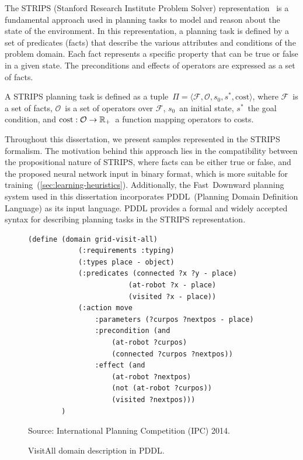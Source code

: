 The STRIPS (Stanford Research Institute Problem Solver) representation~\cite{Fikes.Nilsson/1971} is a fundamental approach used in planning tasks to model and reason about the state of the environment. In this representation, a planning task is defined by a set of predicates (facts) that describe the various attributes and conditions of the problem domain. Each fact represents a specific property that can be true or false in a given state. The preconditions and effects of operators are expressed as a set of facts.

\begin{definition}
    \label{def:strips}
    A STRIPS planning task is defined as a tuple~$\Pi=\langle\mathcal{F},\mathcal{O},s_0,s^*, \text{cost}\rangle$, where $\mathcal{F}$~is a set of facts, $\mathcal{O}$~is a set of operators over $\mathcal{F}$, $s_0$~an initial state, $s^*$~the goal condition, and $\text{cost}:\mathcal{O}\rightarrow\mathbb{R}_{+}$~a function mapping operators to costs.
\end{definition}

Throughout this dissertation, we present samples represented in the STRIPS formalism. The motivation behind this approach lies in the compatibility between the propositional nature of STRIPS, where facts can be either true or false, and the proposed neural network input in binary format, which is more suitable for training~(\cref{sec:learning-heuristics}). Additionally, the Fast~Downward planning system used in this dissertation incorporates PDDL~(Planning Domain Definition Language) as its input language. PDDL provides a formal and widely accepted syntax for describing planning tasks in the STRIPS representation.

\begin{figure}[ht]
    \caption{VisitAll domain description in PDDL.}
    \label{fig:pddl}
    \centering
    \begin{lstlisting}[basicstyle=\ttfamily]
        (define (domain grid-visit-all)
            (:requirements :typing)
            (:types place - object)
            (:predicates (connected ?x ?y - place)
                        (at-robot ?x - place)
                        (visited ?x - place))
            (:action move
                :parameters (?curpos ?nextpos - place)
                :precondition (and
                    (at-robot ?curpos)
                    (connected ?curpos ?nextpos))
                :effect (and 
                    (at-robot ?nextpos)
                    (not (at-robot ?curpos))
                    (visited ?nextpos)))
        )
    \end{lstlisting}
    Source: International Planning Competition (IPC) 2014.
\end{figure}

